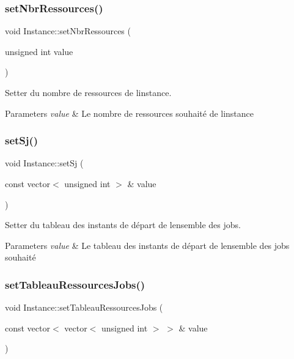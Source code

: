 \subsubsection{\texorpdfstring{set\+Nbr\+Ressources()}{setNbrRessources()}}
{\footnotesize\ttfamily void Instance\+::set\+Nbr\+Ressources (\begin{DoxyParamCaption}\item[{unsigned int}]{value }\end{DoxyParamCaption})}



Setter du nombre de ressources de l\textquotesingle{}instance. 


\begin{DoxyParams}{Parameters}
{\em value} & Le nombre de ressources souhaité de l\textquotesingle{}instance \\
\hline
\end{DoxyParams}
\mbox{\label{classInstance_af695a8a91368f2484ee7367b14144742}} 
\subsubsection{\texorpdfstring{set\+Sj()}{setSj()}}
{\footnotesize\ttfamily void Instance\+::set\+Sj (\begin{DoxyParamCaption}\item[{const vector$<$ unsigned int $>$ \&}]{value }\end{DoxyParamCaption})}



Setter du tableau des instants de départ de l\textquotesingle{}ensemble des jobs. 


\begin{DoxyParams}{Parameters}
{\em value} & Le tableau des instants de départ de l\textquotesingle{}ensemble des jobs souhaité \\
\hline
\end{DoxyParams}
\mbox{\label{classInstance_a702ba79351487440788af8d662f1266c}} 
\subsubsection{\texorpdfstring{set\+Tableau\+Ressources\+Jobs()}{setTableauRessourcesJobs()}}
{\footnotesize\ttfamily void Instance\+::set\+Tableau\+Ressources\+Jobs (\begin{DoxyParamCaption}\item[{const vector$<$ vector$<$ unsigned int $>$ $>$ \&}]{value }\end{DoxyParamCaption})}



